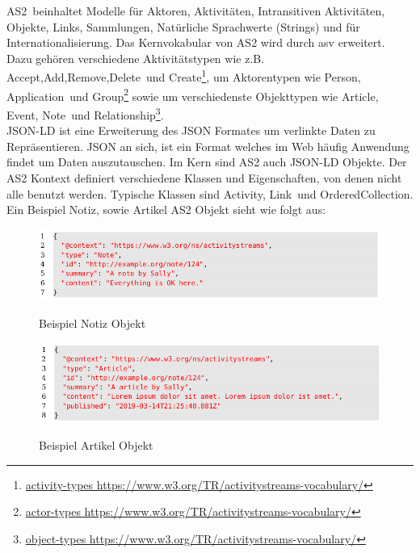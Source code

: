 {	\glqq \gls{AS2}\grqq~beinhaltet Modelle für Aktoren, Aktivitäten, Intransitiven Aktivitäten, Objekte, Links, Sammlungen, Natürliche Sprachwerte (Strings) und für Internationalisierung. Das Kernvokabular von \gls{AS2} wird durch \gls{asv} erweitert. Dazu gehören verschiedene Aktivitätstypen wie z.B. \glqq Accept\grqq,\glqq Add\grqq,\glqq Remove\grqq,\glqq Delete\grqq~und \glqq Create\grqq\footnote{\href{https://www.w3.org/TR/activitystreams-vocabulary/}{activity-types https://www.w3.org/TR/activitystreams-vocabulary/}}, um Aktorentypen wie \glqq Person\grqq, \glqq Application\grqq~und \glqq Group\grqq\footnote{\href{https://www.w3.org/TR/activitystreams-vocabulary/}{actor-types https://www.w3.org/TR/activitystreams-vocabulary/}} sowie um verschiedenste Objekttypen wie \glqq Article\grqq, \glqq Event\grqq, \glqq Note\grqq~und \glqq Relationship\grqq\footnote{\href{https://www.w3.org/TR/activitystreams-vocabulary/}{object-types https://www.w3.org/TR/activitystreams-vocabulary/}}.\\
	
	\gls{JSON-LD} ist eine Erweiterung des JSON Formates um verlinkte Daten zu Repräsentieren. JSON an sich, ist ein Format welches im Web häufig Anwendung findet um Daten auszutauschen. Im Kern sind \gls{AS2} auch \gls{JSON-LD} Objekte. Der \gls{AS2} Kontext definiert verschiedene Klassen und Eigenschaften, von denen nicht alle benutzt werden. Typische Klassen sind \glqq Activity\grqq, \glqq Link\grqq~und \glqq OrderedCollection\grqq. Ein Beispiel Notiz, sowie Artikel \gls{AS2} Objekt sieht wie folgt aus:
	\begin{figure}[h]
		\begin{minipage}{\textwidth}
			\centering
			\includegraphics[scale=0.5]{figures/object-note.png}
			\label{fig:object-note}
			\caption{Beispiel Notiz Objekt}
		\end{minipage}
	\end{figure}
	\begin{figure}[h]
		\begin{minipage}{\textwidth}
			\centering
			\includegraphics[scale=0.5]{figures/object-article.png}
			\label{fig:object-article}
			\caption{Beispiel Artikel Objekt}
		\end{minipage}
	\end{figure}
}

